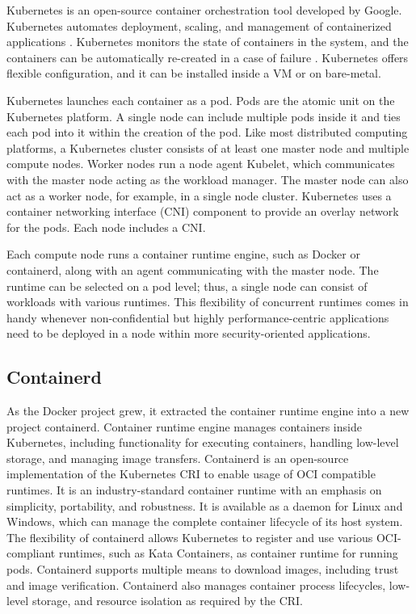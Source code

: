 Kubernetes is an open-source container orchestration tool developed by Google. Kubernetes automates deployment, scaling, and management of containerized applications \cite{Kubernetes}. Kubernetes monitors the state of containers in the system, and the containers can be automatically re-created in a case of failure \cite{Toimela2017}. Kubernetes offers flexible configuration, and it can be installed inside a VM or on bare-metal. 

Kubernetes launches each container as a pod. Pods are the atomic unit on the Kubernetes platform. A single node can include multiple pods inside it and ties each pod into it within the creation of the pod. Like most distributed computing platforms, a Kubernetes cluster consists of at least one master node and multiple compute nodes. Worker nodes run a node agent Kubelet, which communicates with the master node acting as the workload manager. The master node can also act as a worker node, for example, in a single node cluster. Kubernetes uses a container networking interface (CNI)\cite{CNI} component to provide an overlay network for the pods. Each node includes a CNI.

Each compute node runs a container runtime engine, such as Docker or containerd, along with an agent communicating with the master node. The runtime can be selected on a pod level; thus, a single node can consist of workloads with various runtimes. This flexibility of concurrent runtimes comes in handy whenever non-confidential but highly performance-centric applications need to be deployed in a node within more security-oriented applications.

\subsection{Containerd}

As the Docker project grew, it extracted the container runtime engine into a new project containerd\cite{containerd}. Container runtime engine manages containers inside Kubernetes, including functionality for executing containers, handling low-level storage, and managing image transfers. Containerd is an open-source implementation of the Kubernetes CRI to enable usage of OCI compatible runtimes. It is an industry-standard container runtime with an emphasis on simplicity, portability, and robustness. It is available as a daemon for Linux and Windows, which can manage the complete container lifecycle of its host system. The flexibility of containerd allows Kubernetes to register and use various OCI-compliant runtimes, such as Kata Containers, as container runtime for running pods. Containerd supports multiple means to download images, including trust and image verification. Containerd also manages container process lifecycles, low-level storage, and resource isolation as required by the CRI. \cite{containerdGithub}


